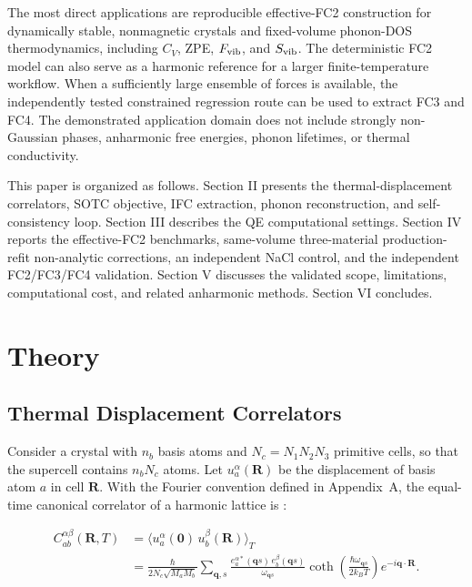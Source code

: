 \documentclass[aps,prb,reprint,amsmath,amssymb,floatfix]{revtex4-2}
\begin{document}
\color{revisionblue}
The most direct applications are reproducible effective-FC2 construction for
dynamically stable, nonmagnetic crystals and fixed-volume phonon-DOS
thermodynamics, including \(C_V\), ZPE, \(F_{\rm vib}\), and
\(S_{\rm vib}\). The deterministic FC2 model can also serve as a harmonic
reference for a larger finite-temperature workflow. When a sufficiently large
ensemble of forces is available, the independently tested constrained
regression route can be used to extract FC3 and FC4. The demonstrated application domain does not
include strongly non-Gaussian phases, anharmonic free energies, phonon
lifetimes, or thermal conductivity.
\color{black}

\color{revisionblue}
This paper is organized as follows. Section II presents the thermal-displacement
correlators, SOTC objective, IFC extraction, phonon reconstruction, and
self-consistency loop. Section III describes the QE computational settings.
Section IV reports the effective-FC2 benchmarks, same-volume three-material
production-refit non-analytic corrections, an independent NaCl control,
and the independent FC2/FC3/FC4 validation. Section V discusses the validated
scope, limitations, computational cost, and related anharmonic methods.
Section VI concludes.
\color{black}

\section{Theory}\label{theory}

\subsection{Thermal Displacement
Correlators}\label{thermal-displacement-correlators}

\color{revisionblue}
Consider a crystal with \(n_b\) basis atoms and \(N_c=N_1N_2N_3\)
primitive cells, so that the supercell contains \(n_bN_c\) atoms. Let
\(u_a^\alpha(\mathbf R)\) be the displacement of basis atom \(a\) in cell
\(\mathbf R\). With the Fourier convention defined in Appendix~A, the
equal-time canonical correlator of a harmonic lattice is \cite{ref13}:
\color{black}

\color{revisionblue}
{\scriptsize
\begin{align}
C_{ab}^{\alpha\beta}(\mathbf{R},T)
  &= \langle u_a^\alpha(\mathbf{0})\, u_b^\beta(\mathbf{R})\rangle_T \nonumber \\
  &= \frac{\hbar}{2N_c\sqrt{M_a M_b}} \sum_{\mathbf{q},s}
     \frac{e_a^{\alpha*}(\mathbf{q}s)\,e_b^{\beta}(\mathbf{q}s)}{\omega_{\mathbf{q}s}}
     \coth\!\left(\frac{\hbar\omega_{\mathbf{q}s}}{2k_BT}\right)
     e^{-i\mathbf{q}\cdot\mathbf{R}} .
\end{align}
}
\color{black}
\end{document}
